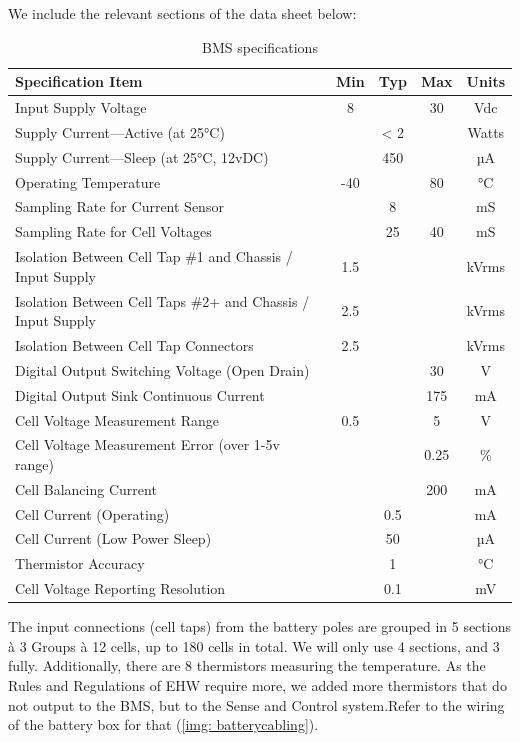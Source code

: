 We include the relevant sections of the data sheet below: \begin{table}[h!]
    \centering
    \begin{tabular}{|l|c|c|c|c|}
    \toprule
    Specification Item & Min & Typ & Max & Units \\
    \midrule
    Input Supply Voltage & 8 & & 30 & Vdc \\
    Supply Current—Active (at 25°C) & & < 2 & & Watts \\
    Supply Current—Sleep (at 25°C, 12vDC) & & 450 & & µA \\
    Operating Temperature & -40 & & 80 & °C \\
    Sampling Rate for Current Sensor & & 8 & & mS \\
    Sampling Rate for Cell Voltages & & 25 & 40 & mS \\
    Isolation Between Cell Tap \#1 and Chassis / Input Supply & 1.5 & & & kVrms \\
    Isolation Between Cell Taps \#2+ and Chassis / Input Supply & 2.5 & & & kVrms \\
    Isolation Between Cell Tap Connectors & 2.5 & & & kVrms \\
    Digital Output Switching Voltage (Open Drain) & & & 30 & V \\
    Digital Output Sink Continuous Current & & & 175 & mA \\
    Cell Voltage Measurement Range & 0.5 & & 5 & V \\
    Cell Voltage Measurement Error (over 1-5v range) & & & 0.25 & \% \\
    Cell Balancing Current & & & 200 & mA \\
    Cell Current (Operating) & & 0.5 & & mA \\
    Cell Current (Low Power Sleep) & & 50 & & µA \\
    Thermistor Accuracy & & 1 & & °C \\
    Cell Voltage Reporting Resolution & & 0.1 & & mV \\
    \bottomrule
    \end{tabular}
    \caption{BMS specifications}
    \label{tab:bms-specification-table}
\end{table}
The input connections (cell taps) from the battery poles are grouped in 5 sections à 3 Groups à 12 cells, up to 180 cells in total. We will only use 4 sections, and 3 fully. Additionally, there are 8 thermistors measuring the temperature. As the Rules and Regulations of EHW require more, we added more thermistors that do not output to the BMS, but to the Sense and Control system.Refer to the wiring of the battery box for that (\ref{img: batterycabling}). \\





